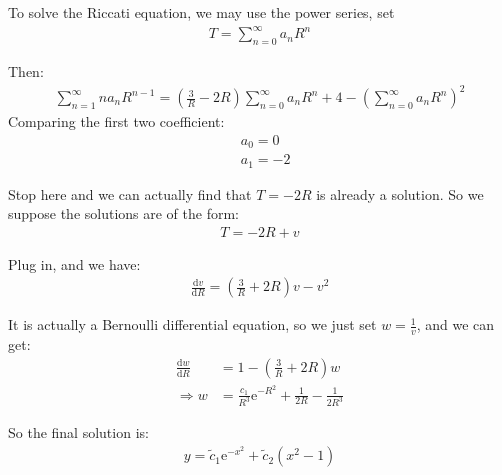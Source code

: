 \documentclass[]{ctexart}
\newcommand{\di}{\mathrm{d}}
\newcommand{\me}{\mathrm{e}}
\begin{document}
		To solve the Riccati equation, we may use the power series, set
			\begin{equation*}
			\begin{aligned}
				T=\sum_{n=0}^{\infty}a_nR^n
			\end{aligned}
			\end{equation*}
			
		Then:
			\begin{equation*}
			\begin{aligned}
				\sum_{n=1}^{\infty}na_nR^{n-1}=\left(\frac{3}{R}-2R\right)\sum_{n=0}^{\infty}a_nR^n+4-\left(\sum_{n=0}^{\infty}a_nR^n\right)^2
			\end{aligned}
			\end{equation*}
		Comparing the first two coefficient:
			\begin{equation*}
			\begin{aligned}
				&a_0=0\\
				&a_1=-2
			\end{aligned}
			\end{equation*}
			
		Stop here and we can actually find that $T=-2R$ is already a solution. So we suppose the solutions are of the form:
			\begin{equation*}
			\begin{aligned}
				T=-2R+v
			\end{aligned}
			\end{equation*}
			
		Plug in, and we have:
			\begin{equation*}
			\begin{aligned}
				\frac{\di v}{\di R}=\left(\frac{3}{R}+2R\right)v-v^2
			\end{aligned}
			\end{equation*}
			
		It is actually a Bernoulli differential equation, so we just set $w=\frac{1}{v}$, and we can get:
			\begin{equation*}
			\begin{aligned}
				\frac{\di w}{\di R}&=1-\left( \frac{3}{R}+2R\right) w\\
				\Rightarrow w&=\frac{c_{1}}{R^{3}} \me^{-R^{2}}+\frac{1}{2 R}-\frac{1}{2 R^{3}}
			\end{aligned}
			\end{equation*}
			
		So the final solution is:
			\begin{equation*}
			\begin{aligned}
				y=\tilde{c}_{1} \me^{-x^{2}}+\tilde{c}_{2}\left(x^{2}-1\right)
			\end{aligned}
			\end{equation*}
\end{document}
